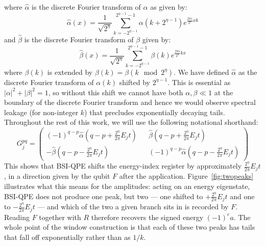 \documentclass[aps,floatfix,10pt,amssymb,amsfont,amsmath,superscriptaddress,float,nofootinbib,longbibliography,nobalancelastpage,twocolumn]{revtex4-2}
\begin{document}
\begin{widetext}
\begin{equation}
\end{equation}
where $\hat \alpha$ is the discrete Fourier transform of $\alpha$ as given by:
\begin{equation}
   \hat\alpha(x) =\frac{1}{\sqrt{2^{\eta}}}\sum_{k=-2^{\eta-1}}^{2^{\eta-1}-1} \alpha(k+2^{\eta-1})e^{\frac{2\pi i}{2^{\eta}}xk}
   \label{eq:alphahat}
\end{equation}
and $\hat \beta$ is the discrete Fourier transform of $\beta$ given by:
\begin{equation}
    \hat\beta(x) =\frac{1}{\sqrt{2^{\eta}}}\sum_{k=-2^{\eta-1}}^{2^{\eta-1}-1} \beta(k)e^{\frac{2\pi i}{2^{\eta}}kx}
\end{equation}
 where $\beta(k)$ is extended by $\beta(k) = \beta(k \mod 2^{\eta})$. We have defined $\hat \alpha$ as the discrete Fourier transform of $\alpha(k)$ shifted by $2^{\eta-1}$. This is essential as $|\alpha|^2+|\beta|^2=1$, so without this shift we cannot have both $\alpha, \beta \ll1$ at the boundary of the discrete Fourier transform and hence we would observe spectral leakage (for non-integer $k$) that precludes exponentially decaying tails. Throughout the rest of this work, we will use the following notational shorthand: 
\begin{equation}
    G_j^{pq} = \begin{pmatrix}
        (-1)^{q-p}\hat\alpha(q-p+\frac{2^{\eta}}{2\pi}E_jt) && \hat\beta(q-p+\frac{2^{\eta}}{2\pi}E_jt)\\
        -\hat\beta (q-p-\frac{2^{\eta}}{2\pi}E_jt) && (-1)^{q-p}\hat\alpha(q-p-\frac{2^{\eta}}{2\pi}E_jt)
    \end{pmatrix}
\end{equation}
This shows that BSI-QPE shifts the energy-index register by approximately $\frac{2^{\eta}}{2\pi}E_jt$, in a direction given by the qubit $F$ after the application. Figure~\ref{fig:twopeaks} illustrates what this means for the amplitudes: acting on an energy eigenstate, BSI-QPE does not produce one peak, but two --- one shifted to $+\frac{2^{\eta}}{2\pi}E_jt$ and one to $-\frac{2^{\eta}}{2\pi}E_jt$ --- and which of the two a given branch sits in is recorded by $F$. Reading $F$ together with $R$ therefore recovers the signed energy $(-1)^e a$. The whole point of the window construction is that each of these two peaks has tails that fall off exponentially rather than as $1/k$.
\end{widetext}
\end{document}
